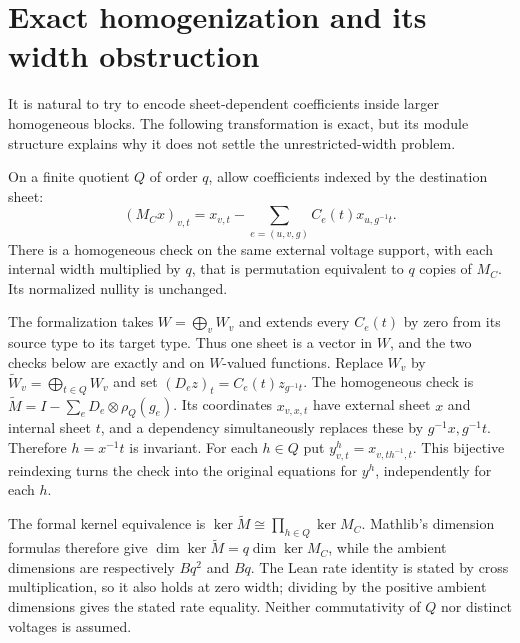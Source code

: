 \section{Exact homogenization and its width obstruction}\label{sec:inflation}

It is natural to try to encode sheet-dependent coefficients inside
larger homogeneous blocks. The following transformation is exact,
but its module structure explains why it does not settle the
unrestricted-width problem.

\begin{proposition}\label{prop:inflation}
On a finite quotient $Q$ of order $q$, allow coefficients indexed by
the destination sheet:
\[
 (M_Cx)_{v,t}=x_{v,t}-\sum_{e=(u,v,g)}C_e(t)x_{u,g^{-1}t}.
\]
There is a homogeneous check on the same external voltage support,
with each internal width multiplied by $q$, that is permutation
equivalent to $q$ copies of $M_C$. Its normalized nullity is unchanged.
\end{proposition}
\begin{outline}
The formalization takes $W=\bigoplus_vW_v$ and extends every
$C_e(t)$ by zero from its source type to its target type. Thus one
sheet is a vector in $W$, and the two checks below are exactly
 and  on $W$-valued functions.
Replace $W_v$ by $\widetilde W_v=\bigoplus_{t\in Q}W_v$ and set
$(D_ez)_t=C_e(t)z_{g^{-1}t}$. The homogeneous check is
$\widetilde M=I-\sum_e D_e\otimes\rho_Q(g_e)$.
Its coordinates $x_{v,x,t}$ have external sheet $x$ and internal
sheet $t$, and a dependency simultaneously replaces these by
$g^{-1}x,g^{-1}t$. Therefore $h=x^{-1}t$ is invariant.
For each $h\in Q$ put $y^h_{v,t}=x_{v,th^{-1},t}$.
This bijective reindexing turns the check into the original equations
for $y^h$, independently for each $h$.

The formal kernel equivalence is
$\ker\widetilde M\cong\prod_{h\in Q}\ker M_C$.
Mathlib's dimension formulas therefore give
$\dim\ker\widetilde M=q\dim\ker M_C$, while the ambient
dimensions are respectively $Bq^2$ and $Bq$. The Lean rate identity
is stated by cross multiplication, so it also holds at zero width;
dividing by the positive ambient dimensions gives the stated rate
equality. Neither commutativity of $Q$ nor distinct voltages is assumed.
\end{outline}

